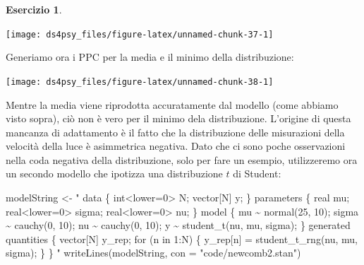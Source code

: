\documentclass[
  11pt,
]{krantz}
\makeatletter
\newenvironment{Shaded}{\begin{snugshade}}{\end{snugshade}}
\newcommand{\AttributeTok}[1]{\textcolor[rgb]{0.61,0.61,0.61}{#1}}
\newcommand{\FunctionTok}[1]{\textcolor[rgb]{0,0,0}{#1}}
\newcommand{\NormalTok}[1]{#1}
\newcommand{\OtherTok}[1]{\textcolor[rgb]{0.37,0.37,0.37}{#1}}
\newcommand{\SpecialCharTok}[1]{\textcolor[rgb]{0,0,0}{#1}}
\newcommand{\StringTok}[1]{\textcolor[rgb]{0.5,0.5,0.5}{#1}}
\newenvironment{kframe}{%
\medskip{}
\setlength{\fboxsep}{.8em}
 \def\at@end@of@kframe{}%
 \ifinner\ifhmode%
  \def\at@end@of@kframe{\end{minipage}}%
  \begin{minipage}{\columnwidth}%
 \fi\fi%
 \def\FrameCommand##1{\hskip\@totalleftmargin \hskip-\fboxsep
 \colorbox{shadecolor}{##1}\hskip-\fboxsep
     \hskip-\linewidth \hskip-\@totalleftmargin \hskip\columnwidth}%
 \MakeFramed {\advance\hsize-\width
   \@totalleftmargin\z@ \linewidth\hsize
   \@setminipage}}%
 {\par\unskip\endMakeFramed%
 \at@end@of@kframe}
\renewenvironment{Shaded}{\begin{kframe}}{\end{kframe}}
\theoremstyle{definition}
\theoremstyle{definition}
\theoremstyle{definition}
\newtheorem{exercise}{Esercizio}[chapter]
\theoremstyle{definition}
\theoremstyle{remark}
\makeatother
\begin{document}
\begin{exercise}
\begin{center}\texttt{[image: ds4psy\_files/figure-latex/unnamed-chunk-37-1]} \end{center}

Generiamo ora i PPC per la media e il minimo della distribuzione:

\begin{Shaded}
\end{Shaded}

\begin{center}\texttt{[image: ds4psy\_files/figure-latex/unnamed-chunk-38-1]} \end{center}

Mentre la media viene riprodotta accuratamente dal modello (come abbiamo visto sopra), ciò non è vero per il minimo dela distribuzione. L'origine di questa mancanza di adattamento è il fatto che la distribuzione delle misurazioni della velocità della luce è asimmetrica negativa. Dato che ci sono poche osservazioni nella coda negativa della distribuzione, solo per fare un esempio, utilizzeremo ora un secondo modello che ipotizza una distribuzione \(t\) di Student:

\begin{Shaded}
\begin{Highlighting}[]
\NormalTok{modelString }\OtherTok{\textless{}{-}} \StringTok{"}
\StringTok{data \{}
\StringTok{  int\textless{}lower=0\textgreater{} N;}
\StringTok{  vector[N] y;}
\StringTok{\}}
\StringTok{parameters \{}
\StringTok{  real mu;}
\StringTok{  real\textless{}lower=0\textgreater{} sigma;}
\StringTok{  real\textless{}lower=0\textgreater{} nu;}
\StringTok{\}}
\StringTok{model \{}
\StringTok{  mu \textasciitilde{} normal(25, 10);}
\StringTok{  sigma \textasciitilde{} cauchy(0, 10);}
\StringTok{  nu \textasciitilde{} cauchy(0, 10);}
\StringTok{  y \textasciitilde{} student\_t(nu, mu, sigma);}
\StringTok{\}}
\StringTok{generated quantities \{}
\StringTok{  vector[N] y\_rep;}
\StringTok{  for (n in 1:N) \{}
\StringTok{    y\_rep[n] = student\_t\_rng(nu, mu, sigma);}
\StringTok{  \}}
\StringTok{\}}
\StringTok{"}
\FunctionTok{writeLines}\NormalTok{(modelString, }\AttributeTok{con =} \StringTok{"code/newcomb2.stan"}\NormalTok{)}
\end{Highlighting}
\end{Shaded}


\end{exercise}
\end{document}
